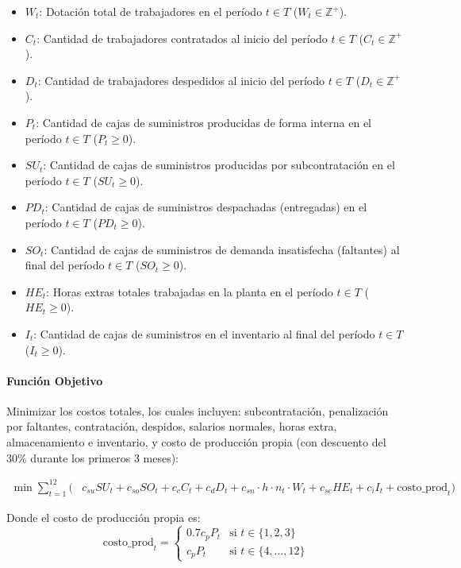 \documentclass[
]{article}
\providecommand{\tightlist}{%
  \setlength{\itemsep}{0pt}\setlength{\parskip}{0pt}}
\begin{document}
\begin{itemize}
\tightlist
\item
  \(W_t\): Dotación total de trabajadores en el período \(t \in T\)
  (\(W_t \in \mathbb{Z}^+\)).
\item
  \(C_t\): Cantidad de trabajadores contratados al inicio del período
  \(t \in T\) (\(C_t \in \mathbb{Z}^+\)).
\item
  \(D_t\): Cantidad de trabajadores despedidos al inicio del período
  \(t \in T\) (\(D_t \in \mathbb{Z}^+\)).
\item
  \(P_t\): Cantidad de cajas de suministros producidas de forma interna
  en el período \(t \in T\) (\(P_t \ge 0\)).
\item
  \(SU_t\): Cantidad de cajas de suministros producidas por
  subcontratación en el período \(t \in T\) (\(SU_t \ge 0\)).
\item
  \(PD_t\): Cantidad de cajas de suministros despachadas (entregadas) en
  el período \(t \in T\) (\(PD_t \ge 0\)).
\item
  \(SO_t\): Cantidad de cajas de suministros de demanda insatisfecha
  (faltantes) al final del período \(t \in T\) (\(SO_t \ge 0\)).
\item
  \(HE_t\): Horas extras totales trabajadas en la planta en el período
  \(t \in T\) (\(HE_t \ge 0\)).
\item
  \(I_t\): Cantidad de cajas de suministros en el inventario al final
  del período \(t \in T\) (\(I_t \ge 0\)).
\end{itemize}

\hypertarget{funciuxf3n-objetivo}{%
\paragraph{Función Objetivo}\label{funciuxf3n-objetivo}}

Minimizar los costos totales, los cuales incluyen: subcontratación,
penalización por faltantes, contratación, despidos, salarios normales,
horas extra, almacenamiento e inventario, y costo de producción propia
(con descuento del \(30\%\) durante los primeros 3 meses):

\[\begin{aligned}
\min \sum_{t=1}^{12} \Big( &c_{su} SU_t + c_{so} SO_t + c_c C_t + c_d D_t + c_{sn} \cdot h \cdot n_t \cdot W_t + c_{se} HE_t + c_i I_t + \text{costo\_prod}_t \Big)
\end{aligned}\]

Donde el costo de producción propia es:
\[\text{costo\_prod}_t = \begin{cases} 
0.7 c_p P_t & \text{si } t \in \{1, 2, 3\} \\
c_p P_t & \text{si } t \in \{4, \dots, 12\}
\end{cases}\]
\end{document}
